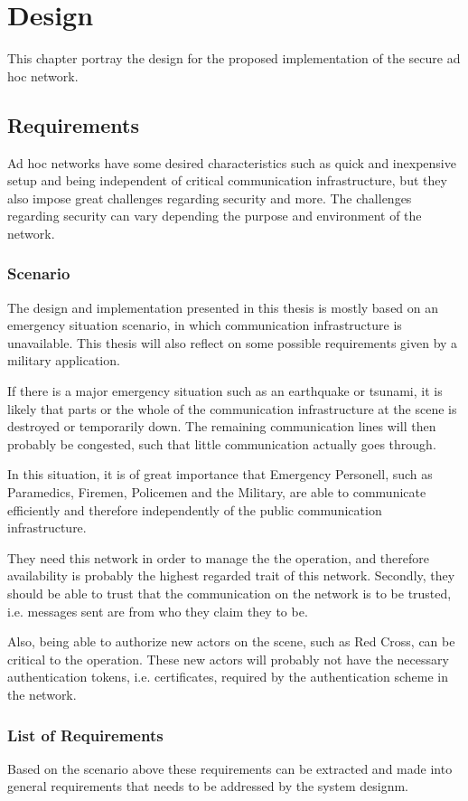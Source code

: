 \chapter{Design}
This chapter portray the design for the proposed implementation of the secure ad
hoc network.

\section{Requirements}
Ad hoc networks have some desired characteristics such as quick and inexpensive
setup and being independent of critical communication infrastructure, but they
also impose great challenges regarding security and more. The challenges
regarding security can vary depending the purpose and environment of the
network.

\subsection{Scenario}
The design and implementation presented in this thesis is mostly based on an
emergency situation scenario, in which communication infrastructure is
unavailable. This thesis will also reflect on some possible requirements given
by a military application.

If there is a major emergency situation such as an earthquake or tsunami, it is
likely that parts or the whole of the communication infrastructure at the scene
is destroyed or temporarily down. The remaining communication lines will then
probably be congested, such that little communication actually goes through.

In this situation, it is of great importance that Emergency Personell, such as
Paramedics, Firemen, Policemen and the Military, are able to communicate
efficiently and therefore independently of the public communication
infrastructure.

They need this network in order to manage the the operation, and therefore
availability is probably the highest regarded trait of this network. Secondly,
they should be able to trust that the communication on the network is to be
trusted, i.e. messages sent are from who they claim they to be.

Also, being able to authorize new actors on the scene, such as Red Cross, can be
critical to the operation. These new actors will probably not have the necessary
authentication tokens, i.e. certificates, required by the authentication scheme
in the network.

\subsection{List of Requirements}
Based on the scenario above these requirements can be extracted and made into
general requirements that needs to be addressed by the system designm.

